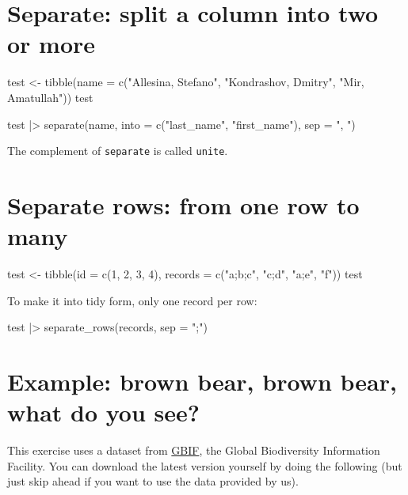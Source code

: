 \documentclass[
  letterpaper,
  DIV=11,
  numbers=noendperiod]{scrreprt}
\newenvironment{Shaded}{\begin{snugshade}}{\end{snugshade}}
\newcommand{\NormalTok}[1]{\textcolor[rgb]{0.00,0.23,0.31}{#1}}
\begin{document}
\section{Separate: split a column into two or
more}\label{separate-split-a-column-into-two-or-more}

\begin{Shaded}
\begin{Highlighting}[]
\NormalTok{test \textless{}{-} tibble(name = c("Allesina, Stefano", "Kondrashov, Dmitry", "Mir, Amatullah"))}
\NormalTok{test}
\end{Highlighting}
\end{Shaded}

\begin{Shaded}
\begin{Highlighting}[]
\NormalTok{test |\textgreater{} separate(name, into = c("last\_name", "first\_name"), sep = ", ")}
\end{Highlighting}
\end{Shaded}

The complement of \texttt{separate} is called \texttt{unite}.

\section{Separate rows: from one row to
many}\label{separate-rows-from-one-row-to-many}

\begin{Shaded}
\begin{Highlighting}[]
\NormalTok{test \textless{}{-} tibble(id = c(1, 2, 3, 4), records = c("a;b;c", "c;d", "a;e", "f"))}
\NormalTok{test}
\end{Highlighting}
\end{Shaded}

To make it into tidy form, only one record per row:

\begin{Shaded}
\begin{Highlighting}[]
\NormalTok{test |\textgreater{} separate\_rows(records, sep = ";")}
\end{Highlighting}
\end{Shaded}

\section{Example: brown bear, brown bear, what do you
see?}\label{example-brown-bear-brown-bear-what-do-you-see}

This exercise uses a dataset from \href{https://www.gbif.org/en/}{GBIF},
the Global Biodiversity Information Facility. You can download the
latest version yourself by doing the following (but just skip ahead if
you want to use the data provided by us).
\end{document}
